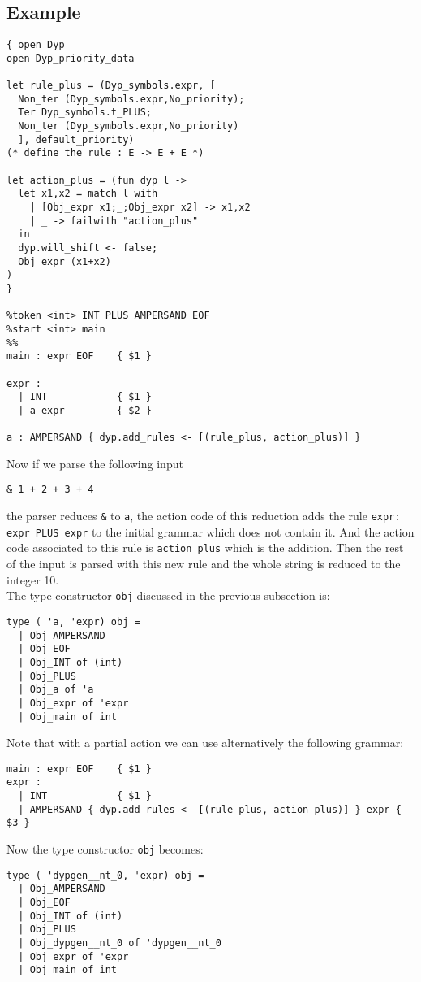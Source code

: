 \documentclass[12pt]{article}
\begin{document}
{\subsection{Example}\label{example}
\begin{verbatim}
{ open Dyp
open Dyp_priority_data

let rule_plus = (Dyp_symbols.expr, [
  Non_ter (Dyp_symbols.expr,No_priority);
  Ter Dyp_symbols.t_PLUS;
  Non_ter (Dyp_symbols.expr,No_priority)
  ], default_priority)
(* define the rule : E -> E + E *)

let action_plus = (fun dyp l ->
  let x1,x2 = match l with
    | [Obj_expr x1;_;Obj_expr x2] -> x1,x2
    | _ -> failwith "action_plus"
  in
  dyp.will_shift <- false;
  Obj_expr (x1+x2)
)
}

%token <int> INT PLUS AMPERSAND EOF
%start <int> main
%%
main : expr EOF    { $1 }

expr :
  | INT            { $1 }
  | a expr         { $2 }

a : AMPERSAND { dyp.add_rules <- [(rule_plus, action_plus)] }
\end{verbatim}

Now if we parse the following input
\begin{verbatim}
& 1 + 2 + 3 + 4
\end{verbatim}
the parser reduces \texttt{\&} to \texttt{a}, the action code of this reduction adds the rule \texttt{expr: expr PLUS expr} to the initial grammar which does not contain it. And the action code associated to this rule is \texttt{action\_plus} which is the addition. Then the rest of the input is parsed with this new rule and the whole string is reduced to the integer 10.\\

The type constructor \verb|obj| discussed in the previous subsection is:
\begin{verbatim}
type ( 'a, 'expr) obj =
  | Obj_AMPERSAND
  | Obj_EOF
  | Obj_INT of (int)
  | Obj_PLUS
  | Obj_a of 'a
  | Obj_expr of 'expr
  | Obj_main of int
\end{verbatim}

Note that with a partial action we can use alternatively the following grammar:
\begin{verbatim}
main : expr EOF    { $1 }
expr :
  | INT            { $1 }
  | AMPERSAND { dyp.add_rules <- [(rule_plus, action_plus)] } expr { $3 }
\end{verbatim}

Now the type constructor \verb|obj| becomes:
\begin{verbatim}
type ( 'dypgen__nt_0, 'expr) obj =
  | Obj_AMPERSAND
  | Obj_EOF
  | Obj_INT of (int)
  | Obj_PLUS
  | Obj_dypgen__nt_0 of 'dypgen__nt_0
  | Obj_expr of 'expr
  | Obj_main of int
\end{verbatim}

}
\end{document}
